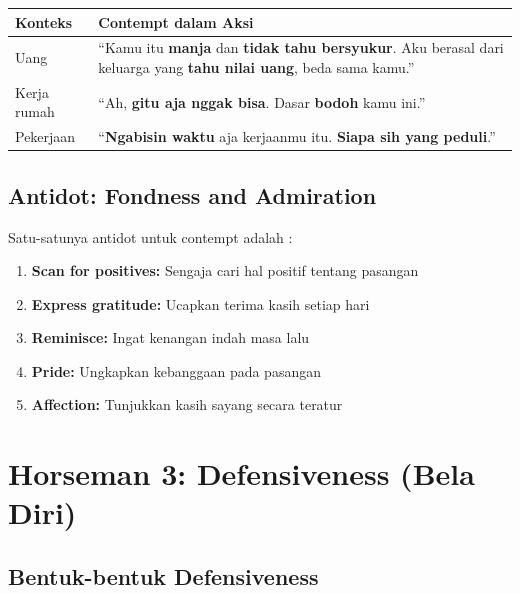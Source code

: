 \begin{center}
\renewcommand{\arraystretch}{1.4}
\begin{tabular}{|>{\raggedright}p{6cm}|>{\raggedright\arraybackslash}p{9cm}|}
\hline
\rowcolor{accent!20}
\textbf{Konteks} & \textbf{Contempt dalam Aksi} \\
\hline
Uang & ``Kamu itu \textbf{manja} dan \textbf{tidak tahu bersyukur}. Aku berasal dari keluarga yang \textbf{tahu nilai uang}, beda sama kamu.'' \\
\hline
Kerja rumah & ``Ah, \textbf{gitu aja nggak bisa}. Dasar \textbf{bodoh} kamu ini.'' \\
\hline
Pekerjaan & ``\textbf{Ngabisin waktu} aja kerjaanmu itu. \textbf{Siapa sih yang peduli}.'' \\
\hline
\end{tabular}
\end{center}

\subsection{Antidot: Fondness and Admiration}

Satu-satunya antidot untuk contempt adalah :

\begin{tipbox}
\begin{enumerate}
    \item \textbf{Scan for positives:} Sengaja cari hal positif tentang pasangan
    \item \textbf{Express gratitude:} Ucapkan terima kasih setiap hari
    \item \textbf{Reminisce:} Ingat kenangan indah masa lalu
    \item \textbf{Pride:} Ungkapkan kebanggaan pada pasangan
    \item \textbf{Affection:} Tunjukkan kasih sayang secara teratur
\end{enumerate}
\end{tipbox}

\section{Horseman 3: Defensiveness (Bela Diri)}

\subsection{Bentuk-bentuk Defensiveness}

